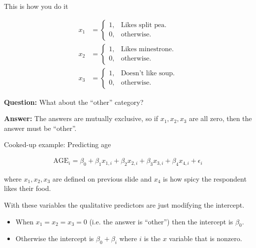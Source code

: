\documentclass[aspectratio=169]{beamer}
\begin{document}
\begin{frame}{This is how you do it}

\begin{align*}
x_1 &=\begin{cases}
    1, & \text{Likes split pea}.\\
    0, & \text{otherwise}.
  \end{cases}\\
x_2 &=\begin{cases}
    1, & \text{Likes minestrone}.\\
    0, & \text{otherwise}.
  \end{cases} \\
x_3 &=\begin{cases}
    1, & \text{Doesn't like soup}.\\
    0, & \text{otherwise}.
  \end{cases}  
\end{align*}
 
  \textbf{Question:} What about the ``other'' category?  
  
  \pause
  
  \textbf{Answer: } The answers are mutually exclusive, so if $x_1, x_2, x_3$ are all zero, then the answer must be ``other''.

\end{frame}

\begin{frame}{Cooked-up example:  Predicting age}

\begin{align*}
\text{AGE}_i = \beta_0 + \beta_1 x_{1,i} + \beta_2 x_{2,i} + \beta_3 x_{3,i} + \beta_4 x_{4,i} + \epsilon_i
\end{align*}

where $x_{1}, x_2, x_3$ are defined on previous slide and $x_4$ is how spicy the respondent likes their food.

\vspace{5mm}

With these variables the qualitative predictors are just modifying the intercept.  
\begin{itemize}
\item When $x_1=x_2=x_3=0$ (i.e. the answer is ``other'') then the intercept is $\beta_0$.
\item Otherwise the intercept is $\beta_0+\beta_i$ where $i$ is the $x$ variable that is nonzero.
\end{itemize}

\end{frame}
\end{document}
